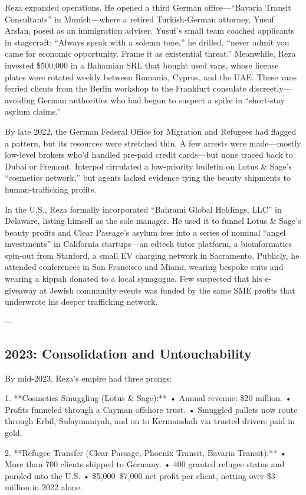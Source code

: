 Reza expanded operations. He opened a third German office—“Bavaria Transit Consultants” in Munich—where a retired Turkish-German attorney, Yusuf Arslan, posed as an immigration adviser. Yusuf’s small team coached applicants in stagecraft: “Always speak with a solemn tone,” he drilled, “never admit you came for economic opportunity. Frame it as existential threat.” Meanwhile, Reza invested \$500,000 in a Bahamian SRL that bought used vans, whose license plates were rotated weekly between Romania, Cyprus, and the UAE. These vans ferried clients from the Berlin workshop to the Frankfurt consulate discreetly—avoiding German authorities who had begun to suspect a spike in “short-stay asylum claims.”

By late 2022, the German Federal Office for Migration and Refugees had flagged a pattern, but its resources were stretched thin. A few arrests were made—mostly low-level brokers who’d handled pre-paid credit cards—but none traced back to Dubai or Fremont. Interpol circulated a low-priority bulletin on Lotus \& Sage’s “cosmetics network,” but agents lacked evidence tying the beauty shipments to human-trafficking profits.

In the U.S., Reza formally incorporated “Bahrami Global Holdings, LLC” in Delaware, listing himself as the sole manager. He used it to funnel Lotus \& Sage’s beauty profits and Clear Passage’s asylum fees into a series of nominal “angel investments” in California startups—an edtech tutor platform, a bioinformatics spin-out from Stanford, a small EV charging network in Sacramento. Publicly, he attended conferences in San Francisco and Miami, wearing bespoke suits and wearing a kippah donated to a local synagogue. Few suspected that his e-giveaway at Jewish community events was funded by the same SME profits that underwrote his deeper trafficking network.

---

\subsection{2023: Consolidation and Untouchability}

By mid-2023, Reza’s empire had three prongs:

1. **Cosmetics Smuggling (Lotus \& Sage):**
   • Annual revenue: \$20 million.
   • Profits funneled through a Cayman offshore trust.
   • Smuggled pallets now route through Erbil, Sulaymaniyah, and on to Kermanshah via trusted drivers paid in gold.

2. **Refugee Transfer (Clear Passage, Phoenix Transit, Bavaria Transit):**
   • More than 700 clients shipped to Germany.
   • 400 granted refugee status and paroled into the U.S.
   • \$5,000–\$7,000 net profit per client, netting over \$3 million in 2022 alone.

